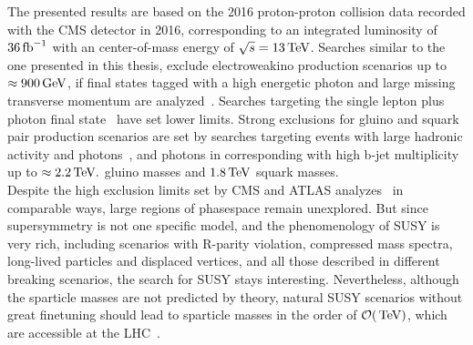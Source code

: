 The presented results are based on the 2016 proton-proton collision data recorded with the CMS detector in 2016, corresponding to an integrated luminosity of $36\mbox{\ensuremath{\,\text{fb}^\text{$-$1}}}$ with an center-of-mass energy of $\sqrt{s}=13\,\text{Te\hspace{-.08em}V}$. Searches similar to the one presented in this thesis, exclude electroweakino production scenarios up to $\approx900\,\text{Ge\hspace{-.08em}V}$, if final states tagged with a high energetic photon and large missing transverse momentum are analyzed~\cite{PhotonMet}. Searches targeting the single lepton plus photon final state~\cite{PhotonLepton} have set lower limits. Strong exclusions for gluino and squark pair production scenarios are set by searches targeting events with large hadronic activity and photons~\cite{PhotonHT}, and photons in corresponding with high b-jet multiplicity~\cite{PhotonBJet} up to $\approx2.2\,\text{Te\hspace{-.08em}V}.$ gluino masses and $1.8\,\text{Te\hspace{-.08em}V}$ squark masses.\\
Despite the high exclusion limits set by CMS and ATLAS analyzes~\cite{AtlasGMSB1,AtlasGMSB2,AtlasGMSB3} in comparable ways, large regions of phasespace remain unexplored. But since supersymmetry is not one specific model, and the phenomenology of SUSY is very rich, including scenarios with R-parity violation, compressed mass spectra, long-lived particles and displaced vertices, and all those described in different breaking scenarios, the search for SUSY stays interesting. Nevertheless, although the sparticle masses are not predicted by theory, natural SUSY scenarios without great finetuning should lead to sparticle masses in the order of $\mathcal{O}(\,\text{Te\hspace{-.08em}V})$, which are accessible at the LHC~\cite{SUSYNaturalStatus}.

